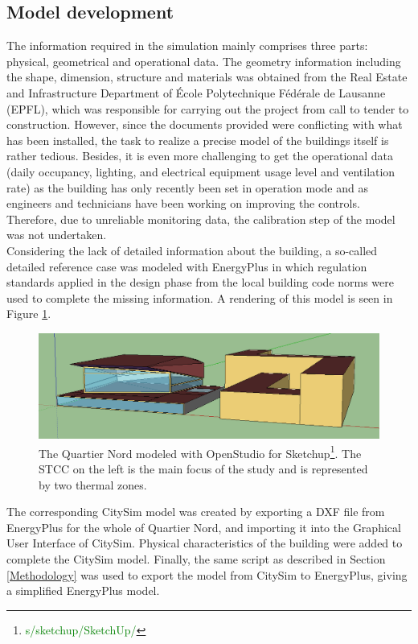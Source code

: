 \documentclass{tBPS2e}
\theoremstyle{plain}
\theoremstyle{definition}
\theoremstyle{remark}
\newcommand{\noteDT}[1]{\footnote{\textcolor{green}{#1}}}
\begin{document}
\subsection{Model development}
The information required in the simulation mainly comprises three parts:
physical, geometrical and operational data. The geometry information including
the shape, dimension, structure and materials was obtained from the Real
Estate and Infrastructure Department of École Polytechnique Fédérale de
Lausanne (EPFL), which was responsible for carrying out the project from call
to tender to construction. However, since the documents provided were conflicting 
with what has been installed, the task to realize a precise model of the
buildings itself is rather tedious. Besides, it is even more challenging to
get the operational data (daily occupancy, lighting, and electrical equipment
usage level and ventilation rate) as the building has only recently been set
in operation mode and as engineers and technicians have been working on
improving the controls. Therefore, due to unreliable monitoring data, the
calibration step of the model was not undertaken.\\

Considering the lack of detailed information about the building, a so-called
detailed reference case was modeled with EnergyPlus \citep{mauree_evaluation_2015} in
which regulation standards applied in the design phase from the local building code norms were
used to complete the missing information. A rendering of this model is seen in
Figure \ref{fig:model_yang}.

\begin{figure}[H]
\centering
\includegraphics[width=\textwidth]{figures/model_yang}
\caption{The Quartier Nord modeled with OpenStudio for
Sketchup\noteDT{s/sketchup/SketchUp/}. The STCC on the left is the main focus
of the study and is represented by two thermal zones.}
\label{fig:model_yang}
\end{figure}

The corresponding CitySim model was created by exporting a DXF file from
EnergyPlus for the whole of Quartier Nord, and importing it into the Graphical User Interface of CitySim.
Physical characteristics of the building were added to complete the CitySim
model. Finally, the same script as described in Section \ref{Methodology} was
used to export the model from CitySim to EnergyPlus, giving a simplified
EnergyPlus model.\\
\end{document}
